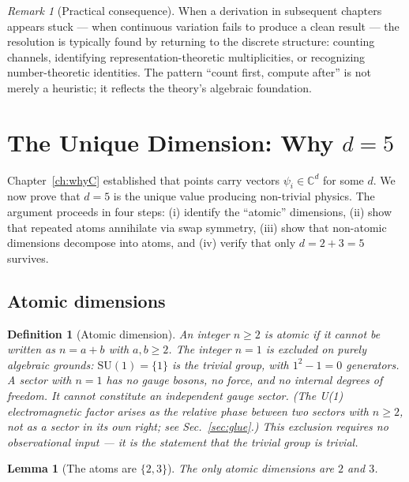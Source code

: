 \documentclass[12pt]{article}
\newtheorem{lemma}[theorem]{Lemma}
\newtheorem{definition}[theorem]{Definition}
\theoremstyle{remark}
\newtheorem{remark}[theorem]{Remark}
\theoremstyle{definition}
\newcommand{\CC}{\mathbb{C}}
\begin{document}
\begin{remark}[Practical consequence]
When a derivation in subsequent chapters appears stuck --- when continuous variation fails to produce a clean result --- the resolution is typically found by returning to the discrete structure: counting channels, identifying representation-theoretic multiplicities, or recognizing number-theoretic identities. The pattern ``count first, compute after'' is not merely a heuristic; it reflects the theory's algebraic foundation.
\end{remark}

\section{The Unique Dimension: Why $d = 5$}
\label{ch:whyd5}

Chapter~\ref{ch:whyC} established that points carry vectors $\psi_i \in \CC^d$ for some $d$. We now prove that $d = 5$ is the unique value producing non-trivial physics. The argument proceeds in four steps: (i) identify the ``atomic'' dimensions, (ii) show that repeated atoms annihilate via swap symmetry, (iii) show that non-atomic dimensions decompose into atoms, and (iv) verify that only $d = 2 + 3 = 5$ survives.

\subsection{Atomic dimensions}

\begin{definition}[Atomic dimension]
An integer $n \geq 2$ is \emph{atomic} if it cannot be written as $n = a + b$ with $a, b \geq 2$. The integer $n = 1$ is excluded on purely algebraic grounds: $\text{SU}(1) = \{1\}$ is the trivial group, with $1^2 - 1 = 0$ generators. A sector with $n = 1$ has no gauge bosons, no force, and no internal degrees of freedom. It cannot constitute an independent gauge sector. (The U(1) electromagnetic factor arises as the \emph{relative phase between two sectors with $n \geq 2$}, not as a sector in its own right; see Sec.~\ref{sec:glue}.) This exclusion requires no observational input --- it is the statement that the trivial group is trivial.
\end{definition}

\begin{lemma}[The atoms are $\{2, 3\}$]
\label{lem:atoms}
The only atomic dimensions are $2$ and $3$.
\end{lemma}
\end{document}
